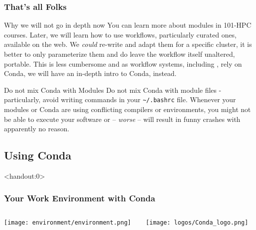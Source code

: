 \begin{frame}[fragile]
  \frametitle{That's all Folks}
   \vspace{-0.8em}
  \begin{alertblock}{Why we will not go in depth now}
You can learn more about modules in 101-HPC courses. Later, we will learn how to use \Snakemake{} workflows, particularly curated ones, available on the web. We \emph{could} re-write and adapt them for a specific cluster, it is better to only parameterize them and do leave the workflow itself unaltered, portable. This is less cumbersome and as workflow systems, including \Snakemake{}, rely on Conda, we will have an in-depth intro to Conda, instead.
  \end{alertblock}
  \vfill
  \begin{alertblock}{Do not mix Conda with Modules}
   Do not mix Conda with module files - particularly, avoid writing  commands in your \texttt{\textasciitilde/.bashrc} file.\newline
   Whenever your modules or Conda are using conflicting compilers or environments, you might not be able to execute your software or -- \emph{worse} -- will result in funny crashes with apparently no reason.
  \end{alertblock}
\end{frame}

\subsection{Using Conda}

\begin{frame}<handout:0> 
  \frametitle{Your Work Environment with Conda}
  \begin{columns}
    \begin{column}{0.5\textwidth}\centering
      \texttt{[image: environment/environment.png]}
    \end{column}
    \begin{column}{0.5\textwidth}\centering
      \texttt{[image: logos/Conda\_logo.png]}   
    \end{column}
  \end{columns}
\end{frame}

